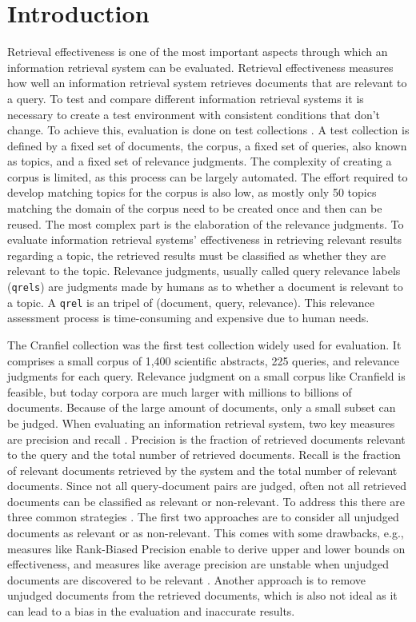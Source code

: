 \chapter{Introduction}\label{introduction} 

Retrieval effectiveness is one of the most important aspects through which an information retrieval system can be evaluated. Retrieval effectiveness measures how well an information retrieval system retrieves documents that are relevant to a query. To test and compare different information retrieval systems it is necessary to create a test environment with consistent conditions that don't change. To achieve this, evaluation is done on test collections \citep{sanderson:2010}. A test collection is defined by a fixed set of documents, the corpus, a fixed set of queries, also known as topics, and a fixed set of relevance judgments. The complexity of creating a corpus is limited, as this process can be largely automated. The effort required to develop matching topics for the corpus is also low, as mostly only 50 topics matching the domain of the corpus need to be created once and then can be reused. The most complex part is the elaboration of the relevance judgments. To evaluate information retrieval systems' effectiveness in retrieving relevant results regarding a topic, the retrieved results must be classified as whether they are relevant to the topic. Relevance judgments, usually called query relevance labels (\texttt{qrels}) are judgments made by humans as to whether a document is relevant to a topic. A \texttt{qrel} is an tripel of (document, query, relevance). This relevance assessment process is time-consuming and expensive due to human needs.

The Cranfiel collection \citep{cleverdon:91} was the first test collection widely used for evaluation. It comprises a small corpus of 1,400 scientific abstracts, 225 queries, and relevance judgments for each query. Relevance judgment on a small corpus like Cranfield is feasible, but today corpora are much larger with millions to billions of documents. Because of the large amount of documents, only a small subset can be judged. When evaluating an information retrieval system, two key measures are precision and recall \citep{voorhees:2001}. Precision is the fraction of retrieved documents relevant to the query and the total number of retrieved documents. Recall is the fraction of relevant documents retrieved by the system and the total number of relevant documents. Since not all query-document pairs are judged, often not all retrieved documents can be classified as relevant or non-relevant. To address this there are three common strategies \citep{froebe:2023}. The first two approaches are to consider all unjudged documents as relevant or as non-relevant. This comes with some drawbacks, e.g., measures like Rank-Biased Precision enable to derive upper and lower bounds on effectiveness, and measures like average precision are unstable when unjudged documents are discovered to be relevant \citep{moffat:08}. Another approach is to remove unjudged documents from the retrieved documents, which is also not ideal as it can lead to a bias in the evaluation and inaccurate results.

